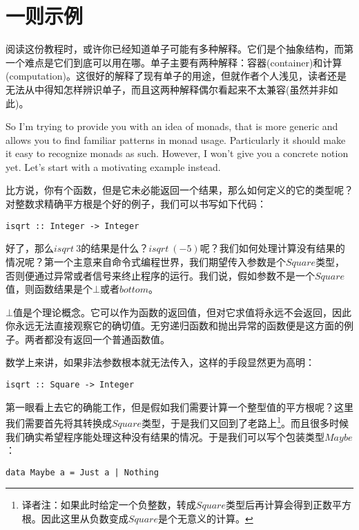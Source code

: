 \section{一则示例}

阅读这份教程时，或许你已经知道单子可能有多种解释。它们是个抽象结构，而第一个难点是它们到底可以用在哪。单子主要有两种解释：容器(container)和计算(computation)。这很好的解释了现有单子的用途，但就作者个人浅见，读者还是无法从中得知怎样辨识单子，而且这两种解释偶尔看起来不太兼容(虽然并非如此)。

So I'm trying to provide you with an idea of monads, that is more generic and allows you to find familiar patterns in monad usage. Particularly it should make it easy to recognize monads as such. However, I won't give you a concrete notion yet. Let's start with a motivating example instead.

比方说，你有个函数，但是它未必能返回一个结果，那么如何定义的它的类型呢？对整数求精确平方根是个好的例子，我们可以书写如下代码：

\begin{lstlisting}
isqrt :: Integer -> Integer
\end{lstlisting}

好了，那么$isqrt\ 3$的结果是什么？$isqrt\ (-5)$呢？我们如何处理计算没有结果的情况呢？第一个主意来自命令式编程世界，我们期望传入参数是个$Square$类型，否则便通过异常或者信号来终止程序的运行。我们说，假如参数不是一个$Square$值，则函数结果是个$\bot$或者$bottom$。

$\bot$值是个理论概念。它可以作为函数的返回值，但对它求值将永远不会返回，因此你永远无法直接观察它的确切值。无穷递归函数和抛出异常的函数便是这方面的例子。两者都没有返回一个普通函数值。

数学上来讲，如果非法参数根本就无法传入，这样的手段显然更为高明：

\begin{lstlisting}
isqrt :: Square -> Integer
\end{lstlisting}

第一眼看上去它的确能工作，但是假如我们需要计算一个整型值的平方根呢？这里我们需要首先将其转换成$Square$类型，于是我们又回到了老路上\footnote{译者注：如果此时给定一个负整数，转成$Square$类型后再计算会得到正数平方根。因此这里从负数变成$Square$是个无意义的计算。}。而且很多时候我们确实希望程序能处理这种没有结果的情况。于是我们可以写个包装类型$Maybe$：

\begin{lstlisting}
data Maybe a = Just a | Nothing
\end{lstlisting}

